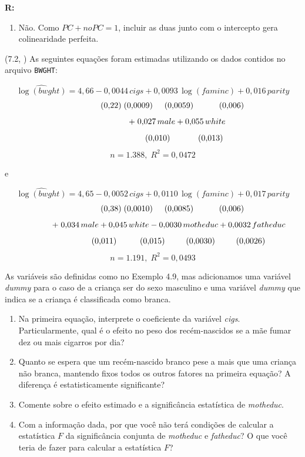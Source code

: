 \documentclass[12pt,letterpaper, onecolumn]{exam}
\renewenvironment{solution}
{\par\noindent\textbf{R:}\enspace\color{blue}}
{\par\color{black}}
\begin{document}
\begin{questions}
\begin{solution}
\begin{enumerate}[label=(\roman*)]
    \item Não. Como \(PC + noPC = 1\), incluir as duas junto com o intercepto gera colinearidade perfeita.
\end{enumerate}
\end{solution}

\vspace{0.7cm}

\question (7.2, \citep{wooldridge2016}) As seguintes equações foram estimadas utilizando os dados contidos no arquivo \texttt{BWGHT}:

\[
\widehat{\log(bwght)} = 4{,}66 - 0{,}0044\,cigs + 0{,}0093\,\log(faminc) + 0{,}016\,parity
\]
\[
\hspace{1.7cm} (0{,}22)\;(0{,}0009)\hspace{0.5cm}(0{,}0059)\hspace{1.1cm}(0{,}006)
\]
\[
\hspace{2.1cm} +\; 0{,}027\,male + 0{,}055\,white
\]
\[
\hspace{2.7cm} (0{,}010)\hspace{1.2cm}(0{,}013)
\]
\[
n = 1{.}388,\; R^2 = 0{,}0472
\]

e

\[
\widehat{\log(bwght)} = 4{,}65 - 0{,}0052\,cigs + 0{,}0110\,\log(faminc) + 0{,}017\,parity
\]
\[
\hspace{1.7cm} (0{,}38)\;(0{,}0010)\hspace{0.5cm}(0{,}0085)\hspace{1.1cm}(0{,}006)
\]
\[
\hspace{1.4cm} +\; 0{,}034\,male + 0{,}045\,white - 0{,}0030\,motheduc + 0{,}0032\,fatheduc
\]
\[
\hspace{2.2cm} (0{,}011)\hspace{1.0cm}(0{,}015)\hspace{0.9cm}(0{,}0030)\hspace{0.9cm}(0{,}0026)
\]
\[
n = 1{.}191,\; R^2 = 0{,}0493
\]

As variáveis são definidas como no Exemplo 4.9, mas adicionamos uma variável \textit{dummy} para o caso de a criança ser do sexo masculino e uma variável \textit{dummy} que indica se a criança é classificada como branca.
\begin{enumerate}[label=(\roman*)]
    \item Na primeira equação, interprete o coeficiente da variável \textit{cigs}. Particularmente, qual é o efeito no peso dos recém-nascidos se a mãe fumar dez ou mais cigarros por dia?
    \item Quanto se espera que um recém-nascido branco pese a mais que uma criança não branca, mantendo fixos todos os outros fatores na primeira equação? A diferença é estatisticamente significante?
    \item Comente sobre o efeito estimado e a significância estatística de \textit{motheduc}.
    \item Com a informação dada, por que você não terá condições de calcular a estatística \(F\) da significância conjunta de \textit{motheduc} e \textit{fatheduc}? O que você teria de fazer para calcular a estatística \(F\)?
\end{enumerate}


\end{questions}
\end{document}
